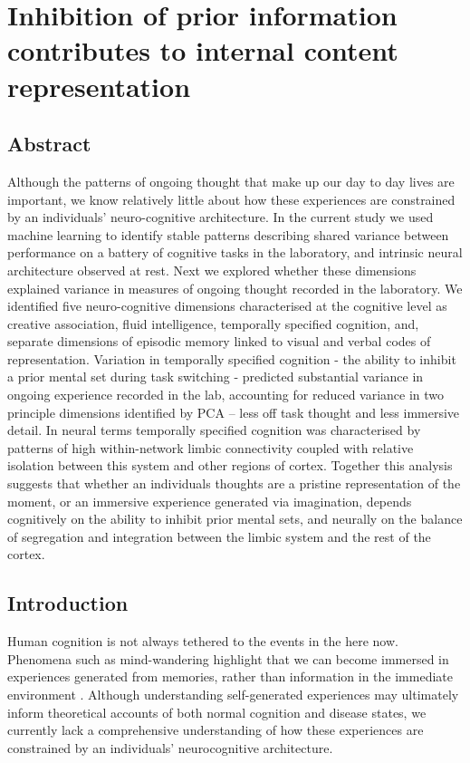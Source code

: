 \chapter{Inhibition of prior information contributes to internal content representation}
\label{ch:study3}
\section{Abstract}
Although the patterns of ongoing thought that make up our day to day lives are important, we know relatively little about how these experiences are constrained by an individuals’ neuro-cognitive architecture. In the current study we used machine learning to identify stable patterns describing shared variance between performance on a battery of cognitive tasks in the laboratory, and intrinsic neural architecture observed at rest. Next we explored whether these dimensions explained variance in measures of ongoing thought recorded in the laboratory. We identified five neuro-cognitive dimensions characterised at the cognitive level as creative association, fluid intelligence, temporally specified cognition, and, separate dimensions of episodic memory linked to visual and verbal codes of representation. Variation in temporally specified cognition - the ability to inhibit a prior mental set during task switching - predicted substantial variance in ongoing experience recorded in the lab, accounting for reduced variance in two principle dimensions identified by PCA  – less off task thought and less immersive detail. In neural terms temporally specified cognition was characterised by patterns of high within-network limbic connectivity coupled with relative isolation between this system and other regions of cortex. Together this analysis suggests that whether an individuals thoughts are a pristine representation of the moment, or an immersive experience generated via imagination, depends cognitively on the ability to inhibit prior mental sets, and neurally on the balance of segregation and integration between the limbic system and the rest of the cortex.

\section{Introduction}
\label{study3:intro}
Human cognition is not always tethered to the events in the here now. Phenomena such as mind-wandering highlight that we can become immersed in experiences generated from memories, rather than information in the immediate environment \cite{SmallwoodSchooler2015}. Although understanding self-generated experiences may ultimately inform theoretical accounts of both normal cognition and disease states, we currently lack a comprehensive understanding of how these experiences are constrained by an individuals’ neurocognitive architecture.

